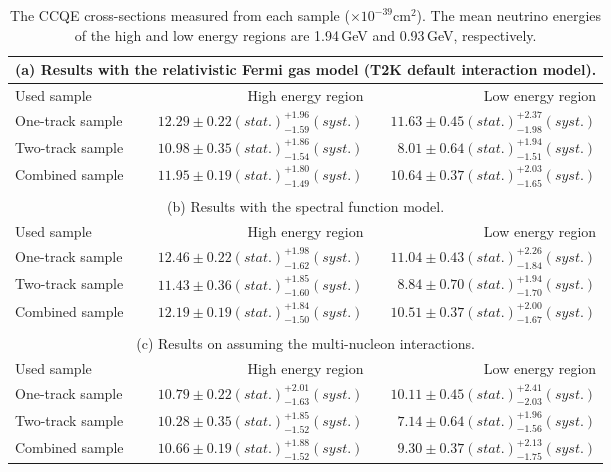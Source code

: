 \documentclass[%
 reprint,
superscriptaddress,
 amsmath,amssymb,
 aps,
]{revtex4-1}
\begin{document}
\begin{table}[htbp]
\begin{center}
\caption{The CCQE cross-sections measured from each sample ($\times 10^{-39}$cm$^2$). 
The mean neutrino energies of the high and low energy regions are 1.94\,GeV and 0.93\,GeV, respectively.}
  \vspace*{-0.1cm}
\begin{tabular}{lrr}
\multicolumn{3}{c}{(a) Results with the relativistic Fermi gas model (T2K default interaction model).}\\
\hline \hline

Used sample & High energy region & Low energy region\\ \hline
One-track sample &  $12.29\pm0.22(stat.)_{-1.59}^{+1.96}(syst.)$&  $11.63\pm0.45(stat.)_{-1.98}^{+2.37}(syst.)$\\
Two-track sample &  $10.98\pm0.35(stat.)_{-1.54}^{+1.86}(syst.)$&  $8.01\pm0.64(stat.)_{-1.51}^{+1.94}(syst.)$\\
Combined sample &  $11.95\pm0.19(stat.)_{-1.49}^{+1.80}(syst.)$&  $10.64\pm0.37(stat.)_{-1.65}^{+2.03}(syst.)$\\
\hline \hline
& \\
\multicolumn{3}{c}{(b) Results with the spectral function model.}\\
\hline \hline
Used sample & High energy region & Low energy region\\ \hline
One-track sample & $12.46\pm0.22(stat.)_{-1.62}^{+1.98}(syst.)$ & $11.04\pm0.43(stat.)_{-1.84}^{+2.26}(syst.)$\\
Two-track sample & $11.43\pm0.36(stat.)_{-1.60}^{+1.85}(syst.)$ & $8.84\pm0.70(stat.)_{-1.70}^{+1.94}(syst.)$\\
Combined sample & $12.19\pm0.19(stat.)_{-1.50}^{+1.84}(syst.)$ & $10.51\pm0.37(stat.)_{-1.67}^{+2.00}(syst.)$\\
\hline \hline
& \\
\multicolumn{3}{c}{(c) Results on assuming the multi-nucleon interactions.}\\
\hline \hline
Used sample & High energy region & Low energy region\\ \hline
One-track sample & $10.79\pm0.22(stat.)_{-1.63}^{+2.01}(syst.)$& $10.11\pm0.45(stat.)_{-2.03}^{+2.41}(syst.)$\\
Two-track sample & $10.28\pm0.35(stat.)_{-1.52}^{+1.85}(syst.)$& $7.14\pm0.64(stat.)_{-1.56}^{+1.96}(syst.)$\\
Combined sample & $10.66\pm0.19(stat.)_{-1.52}^{+1.88}(syst.)$& $9.30\pm0.37(stat.)_{-1.75}^{+2.13}(syst.)$\\
\hline \hline

\end{tabular}
\label{table_ccqe_result}
\end{center}
\end{table}
\end{document}
